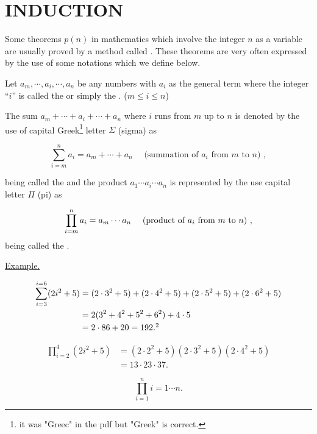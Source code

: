 \documentclass[11pt]{amsbook}
\begin{document}
	\section{INDUCTION} 
	
	Some theorems $p(n)$ in mathematics which involve the integer $n$ as a variable 
	are usually proved by a method called . These theorems are very often expressed by the use of some notations which we define below.
	
	Let $a_{m}, \cdots, a_{i}, \cdots,  a_{n}$ be any numbers with $a_{i}$ as the general term where the integer ``$i$''  is called the  or simply the	. ($m \leq i \leq n$)
	
	The sum $a_{m} + \cdots + a_{i} + \cdots + a_{n}$ where $i$ runs from $m$ up to $n$ is denoted by the use of capital Greek\footnote[1]{it was "Greec" in the pdf but "Greek" is correct.} letter $\Sigma$ (sigma) as
	
	\[\sum_{i = m}^{n}  a_{i} = a_{m} + \cdots + a_{n} \quad \text{ (summation of $a_{i}$ from $m$ to $n$) },\] 
	
	\hDefinedN{$\Sigma$} being called the  and the product $a_{1} \cdots a_{i} \cdots a_{n}$ is represented by the use capital letter $\Pi$ (pi) as
	
	\[
	\prod_{i = m}^{n} a_{i} 
	= a_{m} \cdots a_{n}  
	\quad
	\text{ (product of $ a_{i} $ from $m$ to $n$) },
	\]
	\hDefinedN{$\Pi$} being called the . 
	
	\underline{Example.} 
		\begin{hEnumerateArabic}
			
			\item
			\begin{align*}
				\sum_{i = 3}^{i = 6} (2i^{2} + 5) 
				&=(2 \cdot 3^{2} + 5) 
				+ (2 \cdot 4^{2} + 5) 
				+ (2 \cdot 5^{2} + 5) 
				+ (2 \cdot 6^{2} + 5)\\
				&= 2(3^{2} + 4^{2} + 5^{2} + 6^{2}) + 4 \cdot 5 \\ 
				&= 2 \cdot 86 + 20 = 192. \footnotemark[2]
			\end{align*} 
			
			\item
			\begin{align*} 
				\prod_{i = 2}^{4} (2 i^{2} + 5) 
				&= (2 \cdot 2^{2} + 5)
				(2 \cdot 3^{2} + 5)
				(2 \cdot 4^{2} + 5)\\
				&=13 \cdot 23 \cdot 37.
			\end{align*}							   
			
			\item  
			\[
			\prod_{i = 1}^{n} i
			= 1 \cdots n.
			\]
		\end{hEnumerateArabic}

	
\end{document}

